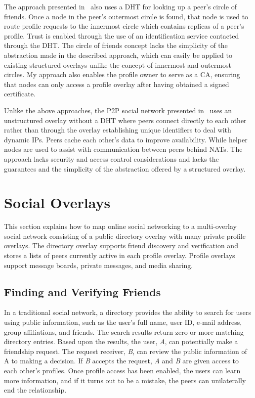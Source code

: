 The approach presented in~\cite{matryoshka} also uses a DHT for looking up a peer's
 circle of friends.  Once a node in the peer's
outermost circle is found, that node is used to route profile requests to the
innermost circle which contains replicas of a peer's profile. Trust is enabled
through the use of an identification service contacted through the DHT.  The
circle of friends concept lacks the simplicity of the abstraction made in the
described approach, which can easily be applied to existing structured overlays
unlike the concept of innermost and outermost circles.  My approach
also enables the profile owner to serve as a CA, ensuring that nodes can only
access a profile overlay after having obtained a signed certificate.  

Unlike the above approaches, the P2P social network presented in~\cite{tribler-osn}
uses an unstructured overlay without a DHT where peers connect directly to
each other rather than through the overlay establishing unique identifiers to
deal with dynamic IPs.  Peers cache each other's data to improve availability.
While helper nodes are used to assist with communication between peers behind
NATs.  The approach lacks security and access control considerations and lacks the
guarantees and the simplicity of the abstraction offered by a structured overlay.

\section{Social Overlays}
\label{social_overlays}
This section explains how to map online social networking to a
multi-overlay social network consisting of a public directory overlay with many
private profile overlays.  The directory overlay supports friend discovery and
verification and stores a lists of peers currently active in each profile
overlay.  Profile overlays support message boards, private messages, and media
sharing.

\subsection{Finding and Verifying Friends}
In a traditional social network, a directory provides the ability to search
for users using public information, such as the user's full name, user ID,
e-mail address, group affiliations, and friends.  The search results return zero
or more matching directory entries.  Based upon the results, the user,
\textit{A}, can potentially make a friendship request.  The request receiver,
\textit{B}, can review the public information of A to making a decision.  If
\textit{B} accepts the request, \textit{A} and \textit{B} are given access to
each other's profiles.  Once profile access has been enabled, the users can
learn more information, and if it turns out to be a mistake, the peers can
unilaterally end the relationship.

